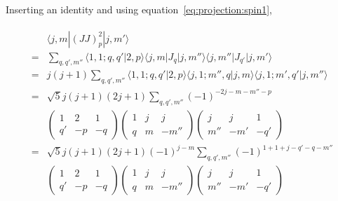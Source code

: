 \documentclass[10pt,fleqn]{article}
\newcommand{\eqar}[1]
{
  \begin{align}
    #1
  \end{align}
}
\begin{document}
Inserting an identity and using equation~\ref{eq:projection:spin1},
\eqar{
  \begin{split}
    &\langle j,m|(JJ)^2_p|j,m'\rangle\\
    =&\sum_{q,q',m''}\langle 1,1;q,q'|2,p\rangle \langle j,m|J_q|j,m''\rangle\langle j,m''|J_{q'}|j,m'\rangle\\
    =&j(j+1)\sum_{q,q',m''}\langle 1,1;q,q'|2,p\rangle
       \langle j,1;m'',q|j,m\rangle
       \langle j,1;m',q'|j,m''\rangle\\
    =&\sqrt{5}j(j+1)(2j+1)\sum_{q,q',m''}(-1)^{-2j-m-m''-p}\\
                                  &\begin{pmatrix}
                                    1&2&1\\
                                    q'&-p&-q
                                  \end{pmatrix}
                                    \begin{pmatrix}
                                      1&j&j\\
                                      q&m&-m''
                                    \end{pmatrix}
                                    \begin{pmatrix}
                                      j&j&1\\
                                      m''&-m'&-q'
                                    \end{pmatrix}\\
    =&\sqrt{5}j(j+1)(2j+1)(-1)^{j-m}\sum_{q,q',m''}(-1)^{1+1+j-q'-q-m''}\\
                                  &\begin{pmatrix}
                                    1&2&1\\
                                    q'&-p&-q
                                  \end{pmatrix}
                                    \begin{pmatrix}
                                      1&j&j\\
                                      q&m&-m''
                                    \end{pmatrix}
                                    \begin{pmatrix}
                                      j&j&1\\
                                      m''&-m'&-q'
                                    \end{pmatrix}\\

\end{split}}
\end{document}
